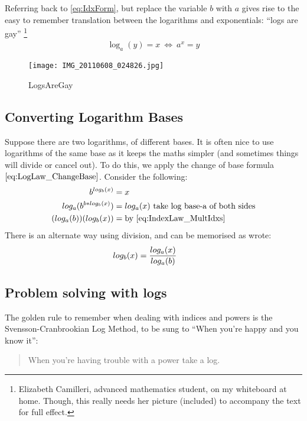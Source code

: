 Referring back to \ref{eq:IdxForm}, but replace the variable $b$ with $a$ gives
rise to the easy to remember translation between the logarithms
and exponentials: ``logs are gay'' \footnote{Elizabeth Camilleri, advanced
mathematics student, on my whiteboard at home. Though, this really needs her
picture (included) to accompany the text for full effect.}
\begin{align}
  \log_a(y) = x ~ \Longleftrightarrow ~ {a}^{x} = y  \label{eq:LogsAreGay}
\end{align}
\begin{figure}[!htb]
  \centering
  \texttt{[image: IMG\_20110608\_024826.jpg]}
  \caption{LogsAreGay}
  \label{fig:LogsAreGay}
\end{figure}

\subsection{Converting Logarithm Bases}
Suppose there are two logarithms, of different bases. It is often nice to use
logarithms of the same base as it keeps the maths simpler (and sometimes things
will divide or cancel out). To do this, we apply the change of base formula
$\eqref{eq:LogLaw_ChangeBase}$. Consider the following:
\begin{align}
  b^{log_b(x)} & = x \\
  log_a(b^{b * log_b(x)}) & = log_a(x) ~ \text{take log base-a of both sides} \\
  (log_a(b))(log_b(x)) & = \text{by \eqref{eq:IndexLaw_MultIdxs}}
\end{align}
There is an alternate way using division, and can be memorised as wrote:
\begin{align}
  log_b(x) & = \frac{log_a(x)}{log_a(b)} ~ \text{ \label{eq:LogLaw_ChangeBase} }
\end{align} 

\subsection{Problem solving with logs}
The golden rule to remember when dealing with indices and powers is the
Svensson-Cranbrookian Log Method, to be sung to ``When you're happy and you know
it'':
\begin{quote}
  When you're having trouble with a power take a log.
\end{quote}

